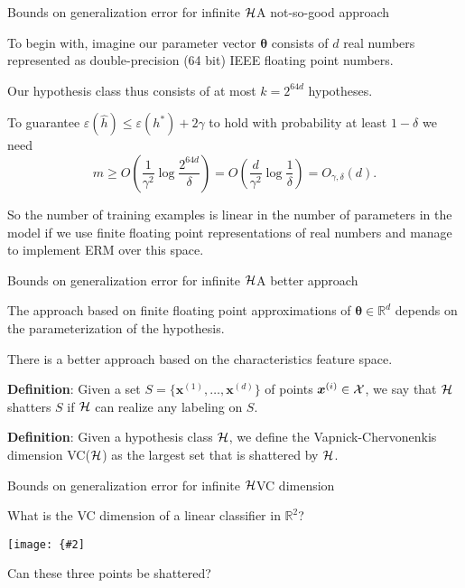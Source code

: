 \documentclass{beamer}
\renewcommand{\vec}[1]{\boldsymbol{#1}}
\def\Rset{\mathbb{R}}
\newcommand{\myfig}[3]{\centerline{\texttt{[image: \{\#2]}}}
    \centerline{\scriptsize #3}}
\begin{document}
\begin{frame}{Bounds on generalization error for infinite $\cal H$}{A not-so-good approach}

  To begin with, imagine our parameter vector $\vec{\theta}$ consists
  of $d$ real numbers represented as double-precision (64 bit) IEEE
  floating point numbers.

  \medskip

  Our hypothesis class thus consists of at most $k = 2^{64d}$ hypotheses.

  \medskip

  To guarantee $\varepsilon(\hat{h}) \le \varepsilon(h^*)+2\gamma$ to
  hold with probability at least $1-\delta$ we need
  \[ m \ge O\left(\frac{1}{\gamma^2}\log\frac{2^{64d}}{\delta}\right) =
  O\left(\frac{d}{\gamma^2}\log\frac{1}{\delta}\right) =
  O_{\gamma,\delta}(d) .\]

  \medskip

  So the number of training examples is \alert{linear in the number of
    parameters in the model} if we use finite floating point
  representations of real numbers and manage to implement ERM over
  this space.

\end{frame}


\begin{frame}{Bounds on generalization error for infinite $\cal H$}{A better approach}

  The approach based on finite floating point approximations of
  $\vec{\theta} \in \Rset^d$ depends on the \alert{parameterization of
    the hypothesis}.

  \medskip

  There is a better approach based on the \alert{characteristics
    feature space}.

  \medskip

  \textbf{Definition}: Given a set $S = \{
  \vec{x}^{(1)},\ldots,\vec{x}^{(d)} \}$ of points $\vec{x}^{(i)} \in
  \cal X$, we say that $\cal H$ \alert{shatters} $S$ if $\cal H$ can
  realize \alert{any labeling on $S$}.

  \medskip

  \textbf{Definition}: Given a hypothesis class $\cal H$, we define
  the \alert{Vapnick-Chervonenkis dimension} VC($\cal H$) as the largest
  set that is shattered by $\cal H$.
  
\end{frame}


\begin{frame}{Bounds on generalization error for infinite $\cal H$}{VC dimension}

  What is the VC dimension of a linear classifier in $\Rset^2$?

  \medskip
  
  \myfig{1.5in}{shatter-points}{Ng (2017), CS229 lecture notes.}

  \medskip

  Can these three points be shattered?
  
\end{frame}
\end{document}
